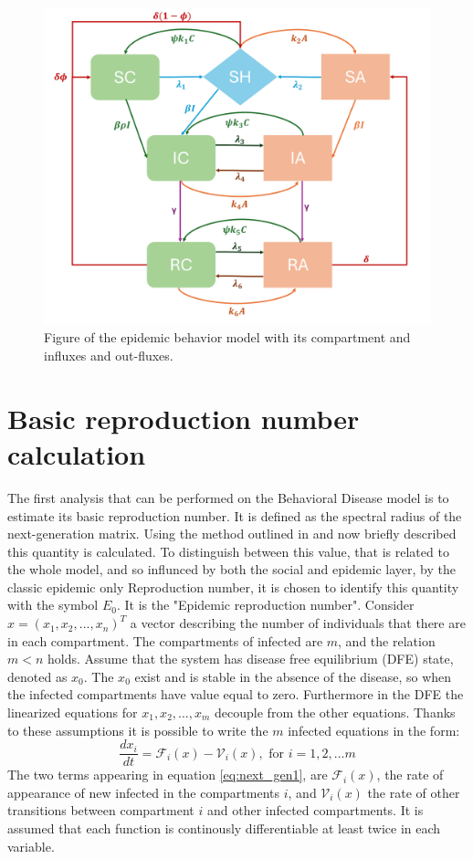\begin{figure}[h]
	\centering
	\includegraphics[height=0.8\linewidth]{1_corpo/figure/model_SAHCIR}
	\caption[Epidemic behavior model]{Figure of the epidemic behavior model with its compartment and influxes and out-fluxes.}
	\label{fig:epibehaviourmodelfigure}
\end{figure}

\section{Basic reproduction number calculation}
The first analysis that can be performed on the Behavioral Disease model is to estimate its basic reproduction number. It is defined as the spectral radius of the next-generation matrix. Using the method outlined in \cite{van_den_Driessche_2017} and now briefly described this quantity is calculated. To distinguish between this value, that is related to the whole model, and so influnced by both the social and epidemic layer, by the classic epidemic only Reproduction number, it is chosen to identify this quantity with the symbol $E_0$. It is the "Epidemic reproduction number". 
Consider $x = (x_1,x_2,...,x_n)^T$ a vector describing the number of individuals that there are in each compartment. The compartments of infected are $m$, and the relation $m < n$ holds. 
Assume that the system has disease free equilibrium (DFE) state, denoted as $x_0$. The $x_0$ exist and is stable in the absence of the disease, so when the infected compartments have value equal to zero. Furthermore in the DFE the linearized equations for $x_1,x_2,...,x_m$ decouple from the other equations. Thanks to these assumptions it is possible to write the $m$ infected equations in the form:
\begin{equation}
\label{eq:next_gen1}
\frac{dx_i}{dt} = \mathcal{F}_i(x) - \mathcal{V}_i(x), \text{ for } i =1,2,...m
\end{equation}
The two terms appearing in equation \ref{eq:next_gen1}, are $\mathcal{F}_i(x)$, the rate of appearance of new infected in the compartments $i$, and $ \mathcal{V}_i(x)$ the rate of other transitions between compartment $i$ and other infected compartments. It is assumed that each function is continously differentiable at least twice in each variable.

